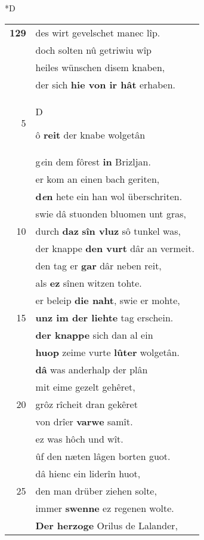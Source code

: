 \documentclass[8pt,a4paper,notitlepage]{article}
\begin{document}
\begin{table}[ht]
\begin{minipage}[t]{0.5\linewidth}
\small
\begin{center}*D
\end{center}
\begin{tabular}{rl}
\textbf{129} & des wirt gevelschet manec lîp.\\ 
 & doch solten nû getriwiu wîp\\ 
 & heiles wünschen disem knaben,\\ 
 & der sich \textbf{hie von ir hât} erhaben.\\ 
5 & \begin{large}D\end{large}ô \textbf{reit} der knabe wolgetân\\ 
 & g\textit{e}in dem fôrest \textbf{in} Brizljan.\\ 
 & er kom an einen bach geriten,\\ 
 & \textbf{d\textit{e}n} hete ein han wol überschriten.\\ 
 & swie dâ stuonden bluomen unt gras,\\ 
10 & durch \textbf{daz} \textbf{sîn vluz} sô tunkel was,\\ 
 & der knappe \textbf{den vurt} dâr an vermeit.\\ 
 & den tag er \textbf{gar} dâr neben reit,\\ 
 & als \textbf{ez} sînen witzen tohte.\\ 
 & er beleip \textbf{die naht}, swie er mohte,\\ 
15 & \textbf{unz im der liehte} tag erschein.\\ 
 & \textbf{der knappe} sich dan al ein\\ 
 & \textbf{huop} zeime vurte \textbf{lûter} wolgetân.\\ 
 & \textbf{dâ} was anderhalp der plân\\ 
 & mit eime gezelt gehêret,\\ 
20 & grôz rîcheit dran gekêret\\ 
 & von drîer \textbf{varwe} samît.\\ 
 & ez was hôch und wît.\\ 
 & ûf den næten lâgen borten guot.\\ 
 & dâ hienc ein liderîn huot,\\ 
25 & den man drüber ziehen solte,\\ 
 & immer \textbf{swenne} ez regenen wolte.\\ 
 & \textbf{Der herzoge} Orilus de Lalander,\\ 

\end{tabular}
\end{minipage}
\end{table}
\end{document}
